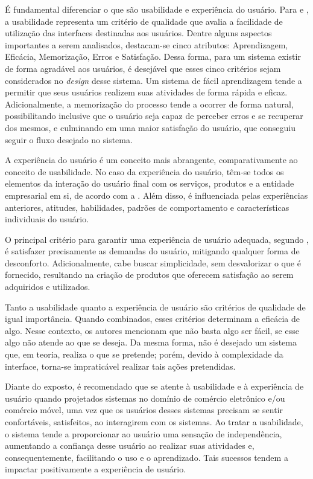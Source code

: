 É fundamental diferenciar o que são usabilidade e experiência do usuário. Para  e , a usabilidade representa um critério de qualidade que avalia a facilidade de utilização das interfaces destinadas aos usuários. Dentre alguns aspectos importantes a serem analisados, destacam-se cinco atributos: Aprendizagem, Eficácia, Memorização, Erros e Satisfação. Dessa forma, para um sistema existir de forma agradável aos usuários, é desejável que esses cinco critérios sejam considerados no \textit{design} desse sistema. Um sistema de fácil aprendizagem tende a permitir que seus usuários realizem suas atividades de forma rápida e eficaz. Adicionalmente, a memorização do processo tende a ocorrer de forma natural, possibilitando inclusive que o usuário seja capaz de perceber erros e se recuperar dos mesmos, e culminando em uma maior satisfação do usuário, que conseguiu seguir o fluxo desejado no sistema.

A experiência do usuário é um conceito mais abrangente, comparativamente ao conceito de usabilidade. No caso da experiência do usuário, têm-se todos os elementos da interação do usuário final com os serviços, produtos e a entidade empresarial em si, de acordo com a . Além disso, é influenciada pelas experiências anteriores, atitudes, habilidades, padrões de comportamento e características individuais do usuário.

O principal critério para garantir uma experiência de usuário adequada, segundo , é satisfazer precisamente as demandas do usuário, mitigando qualquer forma de desconforto. Adicionalmente, cabe buscar simplicidade, sem desvalorizar o que é fornecido, resultando na criação de produtos que oferecem satisfação ao serem adquiridos e utilizados.

Tanto a usabilidade quanto a experiência de usuário são critérios de qualidade de igual importância. Quando combinados, esses critérios determinam a eficácia de algo. Nesse contexto,  os autores  mencionam que não basta algo ser fácil, se esse algo não atende ao que se deseja. Da mesma forma, não é desejado um sistema que, em teoria, realiza o que se pretende; porém, devido à complexidade da interface, torna-se impraticável realizar tais ações pretendidas.

Diante do exposto, é recomendado que se atente à usabilidade e à experiência de usuário quando projetados sistemas no domínio de comércio eletrônico e/ou comércio móvel, uma vez que os usuários desses sistemas precisam se sentir confortáveis, satisfeitos, ao interagirem com os sistemas. Ao tratar a usabilidade, o sistema tende a proporcionar ao usuário uma sensação de independência, aumentando a confiança desse usuário ao realizar suas atividades e, consequentemente, facilitando o uso e o aprendizado. Tais sucessos tendem a impactar positivamente a experiência de usuário.


